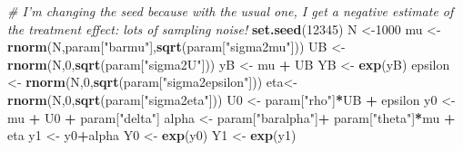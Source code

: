 \documentclass[]{book}
\newenvironment{Shaded}{\begin{snugshade}}{\end{snugshade}}
\newcommand{\KeywordTok}[1]{\textcolor[rgb]{0.13,0.29,0.53}{\textbf{#1}}}
\newcommand{\DecValTok}[1]{\textcolor[rgb]{0.00,0.00,0.81}{#1}}
\newcommand{\StringTok}[1]{\textcolor[rgb]{0.31,0.60,0.02}{#1}}
\newcommand{\CommentTok}[1]{\textcolor[rgb]{0.56,0.35,0.01}{\textit{#1}}}
\newcommand{\OperatorTok}[1]{\textcolor[rgb]{0.81,0.36,0.00}{\textbf{#1}}}
\newcommand{\NormalTok}[1]{#1}
\theoremstyle{definition}
\theoremstyle{definition}
\theoremstyle{definition}
\theoremstyle{remark}
\begin{document}
\begin{Shaded}
\begin{Highlighting}[]
\CommentTok{# I'm changing the seed because with the usual one, I get a negative estimate of the treatment effect: lots of sampling noise!}
\KeywordTok{set.seed}\NormalTok{(}\DecValTok{12345}\NormalTok{)}
\NormalTok{N <-}\DecValTok{1000}
\NormalTok{mu <-}\StringTok{ }\KeywordTok{rnorm}\NormalTok{(N,param[}\StringTok{"barmu"}\NormalTok{],}\KeywordTok{sqrt}\NormalTok{(param[}\StringTok{"sigma2mu"}\NormalTok{]))}
\NormalTok{UB <-}\StringTok{ }\KeywordTok{rnorm}\NormalTok{(N,}\DecValTok{0}\NormalTok{,}\KeywordTok{sqrt}\NormalTok{(param[}\StringTok{"sigma2U"}\NormalTok{]))}
\NormalTok{yB <-}\StringTok{ }\NormalTok{mu }\OperatorTok{+}\StringTok{ }\NormalTok{UB }
\NormalTok{YB <-}\StringTok{ }\KeywordTok{exp}\NormalTok{(yB)}
\NormalTok{epsilon <-}\StringTok{ }\KeywordTok{rnorm}\NormalTok{(N,}\DecValTok{0}\NormalTok{,}\KeywordTok{sqrt}\NormalTok{(param[}\StringTok{"sigma2epsilon"}\NormalTok{]))}
\NormalTok{eta<-}\StringTok{ }\KeywordTok{rnorm}\NormalTok{(N,}\DecValTok{0}\NormalTok{,}\KeywordTok{sqrt}\NormalTok{(param[}\StringTok{"sigma2eta"}\NormalTok{]))}
\NormalTok{U0 <-}\StringTok{ }\NormalTok{param[}\StringTok{"rho"}\NormalTok{]}\OperatorTok{*}\NormalTok{UB }\OperatorTok{+}\StringTok{ }\NormalTok{epsilon}
\NormalTok{y0 <-}\StringTok{ }\NormalTok{mu }\OperatorTok{+}\StringTok{  }\NormalTok{U0 }\OperatorTok{+}\StringTok{ }\NormalTok{param[}\StringTok{"delta"}\NormalTok{]}
\NormalTok{alpha <-}\StringTok{ }\NormalTok{param[}\StringTok{"baralpha"}\NormalTok{]}\OperatorTok{+}\StringTok{  }\NormalTok{param[}\StringTok{"theta"}\NormalTok{]}\OperatorTok{*}\NormalTok{mu }\OperatorTok{+}\StringTok{ }\NormalTok{eta}
\NormalTok{y1 <-}\StringTok{ }\NormalTok{y0}\OperatorTok{+}\NormalTok{alpha}
\NormalTok{Y0 <-}\StringTok{ }\KeywordTok{exp}\NormalTok{(y0)}
\NormalTok{Y1 <-}\StringTok{ }\KeywordTok{exp}\NormalTok{(y1)}


\end{Highlighting}
\end{Shaded}
\end{document}
